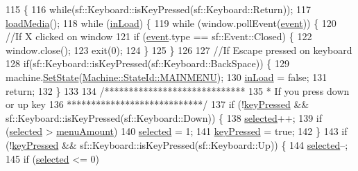\begin{DoxyCode}
115 \{
116     \textcolor{keywordflow}{while}(sf::Keyboard::isKeyPressed(sf::Keyboard::Return));
117     \hyperlink{classStateLoadGame_a380d85c22e9abe790493b79e2f08d12a}{loadMedia}();
118     \textcolor{keywordflow}{while} (\hyperlink{classStateLoadGame_af05aaa81fec05eb682e63515a2371817}{inLoad}) \{
119         \textcolor{keywordflow}{while} (window.pollEvent(\hyperlink{classState_a6e01842c2b93b36eba5d1153aa6ae952}{event})) \{
120             \textcolor{comment}{//If X clicked on window}
121             \textcolor{keywordflow}{if} (\hyperlink{classState_a6e01842c2b93b36eba5d1153aa6ae952}{event}.type == sf::Event::Closed) \{
122                 window.close();
123                 exit(0);
124             \}
125         \}
126 
127         \textcolor{comment}{//If Escape pressed on keyboard}
128         \textcolor{keywordflow}{if}(sf::Keyboard::isKeyPressed(sf::Keyboard::BackSpace)) \{
129             machine.\hyperlink{classMachine_abe967397f2de76335bd90ab7aabd8f9f}{SetState}(\hyperlink{classMachine_a5fb0c119d231dd1bfe1dd2c9ca533520a3287971e79b4dca11067ed287847c1e6}{Machine::StateId::MAINMENU});
130             \hyperlink{classStateLoadGame_af05aaa81fec05eb682e63515a2371817}{inLoad} = \textcolor{keyword}{false};
131             \textcolor{keywordflow}{return};
132         \}
133 
134         \textcolor{comment}{/*****************************}
135 \textcolor{comment}{         * If you press down or up key}
136 \textcolor{comment}{         ****************************/}
137         \textcolor{keywordflow}{if} (!\hyperlink{classStateLoadGame_a6c57b0302c417a8921a20bdb27d46e6c}{keyPressed} && sf::Keyboard::isKeyPressed(sf::Keyboard::Down)) \{
138             \hyperlink{classStateLoadGame_adcf08bbcda5c396a52d513e9576f2b23}{selected}++;
139             \textcolor{keywordflow}{if} (\hyperlink{classStateLoadGame_adcf08bbcda5c396a52d513e9576f2b23}{selected} > \hyperlink{classStateLoadGame_a89730ad10d5c75a3ce4c0d8a0c6f4b79}{menuAmount})
140                 \hyperlink{classStateLoadGame_adcf08bbcda5c396a52d513e9576f2b23}{selected} = 1;
141             \hyperlink{classStateLoadGame_a6c57b0302c417a8921a20bdb27d46e6c}{keyPressed} = \textcolor{keyword}{true};
142         \}
143         \textcolor{keywordflow}{if} (!\hyperlink{classStateLoadGame_a6c57b0302c417a8921a20bdb27d46e6c}{keyPressed} && sf::Keyboard::isKeyPressed(sf::Keyboard::Up)) \{
144             \hyperlink{classStateLoadGame_adcf08bbcda5c396a52d513e9576f2b23}{selected}--;
145             \textcolor{keywordflow}{if} (\hyperlink{classStateLoadGame_adcf08bbcda5c396a52d513e9576f2b23}{selected} <= 0)

\end{DoxyCode}
